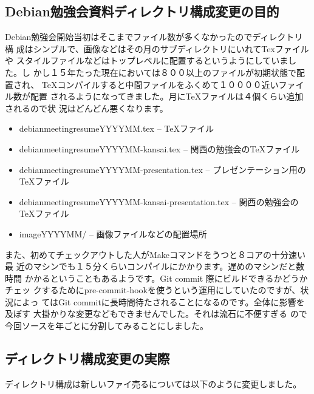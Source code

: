 \documentclass[mingoth,a4paper]{jsarticle}
\begin{document}

\subsection{Debian勉強会資料ディレクトリ構成変更の目的}

Debian勉強会開始当初はそこまでファイル数が多くなかったのでディレクトリ構
成はシンプルで、画像などはその月のサブディレクトリにいれてTexファイルや
スタイルファイルなどはトップレベルに配置するというようにしていました。し
かし１５年たった現在においては８００以上のファイルが初期状態で配置され、
TeXコンパイルすると中間ファイルをふくめて１００００近いファイル数が配置
されるようになってきました。月にTeXファイルは４個くらい追加されるので状
況はどんどん悪くなります。

\begin{itemize}
 \item debianmeetingresumeYYYYMM.tex -- TeXファイル
 \item debianmeetingresumeYYYYMM-kansai.tex -- 関西の勉強会のTeXファイル
 \item debianmeetingresumeYYYYMM-presentation.tex -- プレゼンテーション用のTeXファイル
 \item debianmeetingresumeYYYYMM-kansai-presentation.tex -- 関西の勉強会のTeXファイル
 \item imageYYYYMM/ -- 画像ファイルなどの配置場所
\end{itemize}

また、初めてチェックアウトした人がMakeコマンドをうつと８コアの十分速い最
近のマシンでも１５分くらいコンパイルにかかります。遅めのマシンだと数時間
かかるということもあるようです。Git commit 際にビルドできるかどうかチェッ
クするためにpre-commit-hookを使うという運用にしていたのですが、状況によっ
てはGit commitに長時間待たされることになるのです。全体に影響を及ぼす
大掛かりな変更などもできませんでした。それは流石に不便すぎる
ので今回ソースを年ごとに分割してみることにしました。

\subsection{ディレクトリ構成変更の実際}


ディレクトリ構成は新しいファイ売るについては以下のように変更しました。
\end{document}
